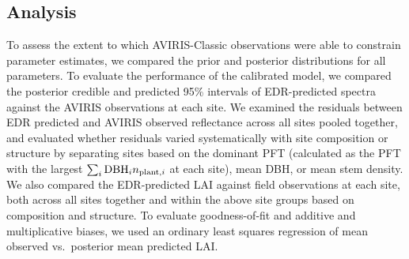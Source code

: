 \subsection{Analysis}

To assess the extent to which AVIRIS-Classic observations were able to constrain parameter estimates, we compared the prior and posterior distributions for all parameters.
To evaluate the performance of the calibrated model, we compared the posterior credible and predicted 95\% intervals of EDR-predicted spectra against the AVIRIS observations at each site.
We examined the residuals between EDR predicted and AVIRIS observed reflectance across all sites pooled together,
and evaluated whether residuals varied systematically with site composition or structure by separating sites based on the dominant PFT (calculated as the PFT with the largest $\sum_{i} \mathrm{DBH}_{i} n_{\mathrm{plant},i}$ at each site), mean DBH, or mean stem density.\@
We also compared the EDR-predicted LAI against field observations at each site, both across all sites together and within the above site groups based on composition and structure.
To evaluate goodness-of-fit and additive and multiplicative biases, we used an ordinary least squares regression of mean observed vs.\ posterior mean predicted LAI.\@
